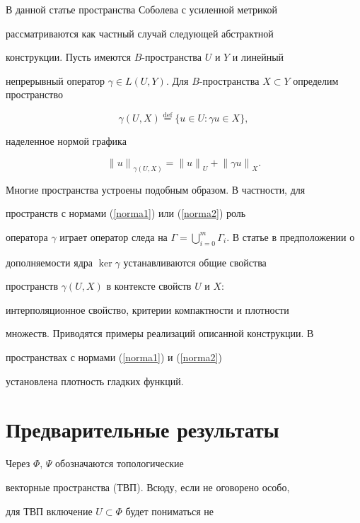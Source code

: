 В данной статье пространства Соболева с усиленной метрикой


рассматриваются как частный случай следующей абстрактной


конструкции. Пусть имеются $B$-пространства $U$ и $Y$ и линейный


непрерывный оператор $\gamma \in L(U,Y)$. Для $B$-пространства $X


\subset Y$ определим пространство


$$


\gamma (U, X) \overset{\mathrm{def}}{=}{} \{u \in U: \gamma u \in X\},


$$


наделенное нормой графика


$$


{\|u\|}_{\gamma(U,X)}={\|u\|}_U+{\|\gamma u\|}_X.


$$


Многие пространства устроены подобным образом. В частности, для


пространств с нормами (\ref{norma1}) или (\ref{norma2}) роль


оператора $\gamma$ играет оператор следа на $\Gamma=\bigcup


\limits_{i=0}^{m} \Gamma_i$. В статье в предположении о


дополняемости ядра $\ker \gamma$ устанавливаются общие свойства


пространств $\gamma(U,X)$ в контексте свойств $U$ и $X$:


интерполяционное свойство, критерии компактности и плотности


множеств. Приводятся примеры реализаций описанной конструкции. В


пространствах с нормами (\ref{norma1}) и (\ref{norma2})


установлена плотность гладких функций.








\section{Предварительные результаты}





Через $\Phi$, $\Psi$ обозначаются топологические


векторные пространства (ТВП). Всюду, если не оговорено особо,


для ТВП включение $U \subset \Phi$ будет пониматься не


